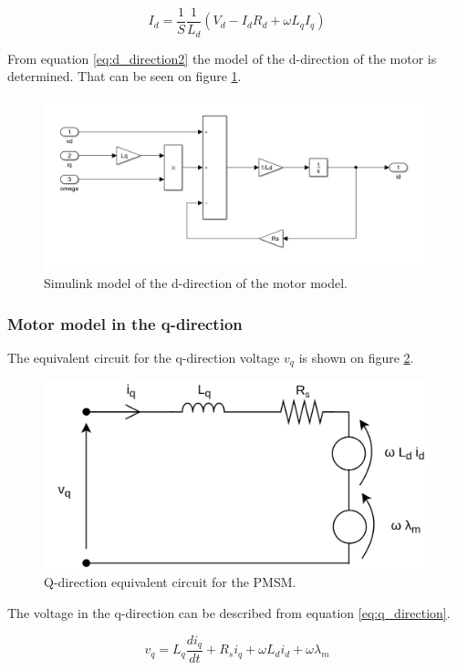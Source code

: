 \begin{equation}
    \label{eq:d_direction2}
    I_d = \frac{1}{S} \frac{1}{L_d} (V_d - I_d R_d + \omega L_q I_q)
\end{equation}

From equation \ref{eq:d_direction2} the model of the d-direction of the motor is determined. That can be seen on figure \ref{fig:simulink_d_direction}.

\begin{figure}[H]
	\centering
	\includegraphics[width=1\linewidth]{pictures/control/simulink_d_direction.PNG}
	\caption{Simulink model of the d-direction of the motor model.}
	\label{fig:simulink_d_direction}
\end{figure}



\subsubsection{Motor model in the q-direction}
The equivalent circuit for the q-direction voltage $v_q$ is shown on figure \ref{fig:vq}.

\begin{figure}[H]
	\centering
	\includegraphics[width=0.6\linewidth]{pictures/control/vq.png}
	\caption{Q-direction equivalent circuit for the PMSM.}
	\label{fig:vq}
\end{figure}

The voltage in the q-direction can be described from equation \ref{eq:q_direction}.

\begin{equation}
\label{eq:q_direction}
    v_q = L_q\frac{d i_q}{dt} + R_s i_q + \omega L_d i_d + \omega \lambda_m
\end{equation}

